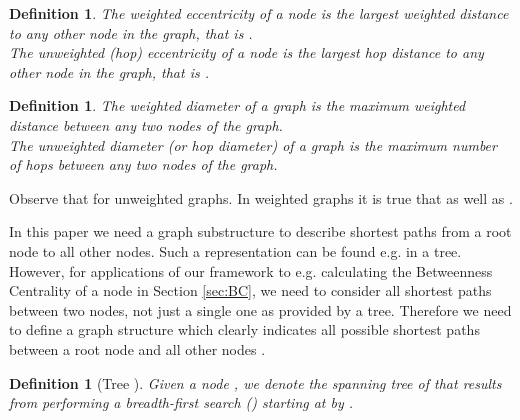 \documentclass[11pt]{article}
\newtheorem{definition}[theorem]{Definition}
\begin{document}
\begin{definition}
The weighted eccentricity  of a node  is the largest weighted distance to any other node in the graph, that is .\\
The unweighted (hop) eccentricity  of a node  is the largest hop distance to any other node in the graph, that is .
\end{definition}

\begin{definition}
The weighted diameter  of a graph  is the maximum weighted distance between any two nodes of the graph.
\\ 
The unweighted diameter (or hop diameter)  of a graph  is the maximum number of hops between any two nodes of the graph.
\end{definition}

Observe that  for unweighted graphs. In weighted graphs it is true that  as well as .

In this paper we need a graph substructure to describe shortest paths from a root node  to all other nodes. Such a representation can be found e.g. in a tree. However, for applications of our framework to e.g. calculating the Betweenness Centrality of a node in Section \ref{sec:BC}, we need to consider all shortest paths between two nodes, not just a single one as provided by a tree.
Therefore we need to define a graph structure which clearly indicates all possible shortest paths between a root node  and all other nodes . 


\begin{definition}[Tree ]
 Given a node , we denote the spanning tree of  that results from performing a breadth-first search () starting at  by .
\end{definition}
\end{document}
